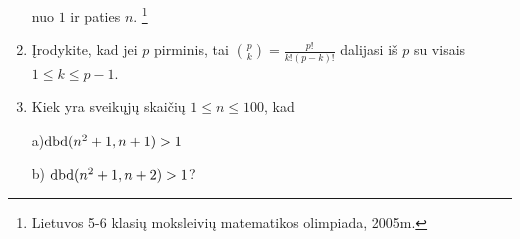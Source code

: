\begin{enumerate}
    nuo $1$ ir paties $n$. \footnote{Lietuvos 5-6 klasių moksleivių
    matematikos olimpiada, 2005m.} 
  \item Įrodykite, kad jei $p$ pirminis, tai $\binom{p}{k} =
    \frac{p!}{k!(p-k)!}$ dalijasi iš $p$ su visais $1\leq k \leq p-1$.
  \item Kiek yra sveikųjų skaičių $1\leq n \leq 100$, kad 

    a)$\operatorname{dbd}(n^2+1,n+1)>1$

    b) $\operatorname{dbd}(n^2+1,n+2)>1$?  


\end{enumerate}

